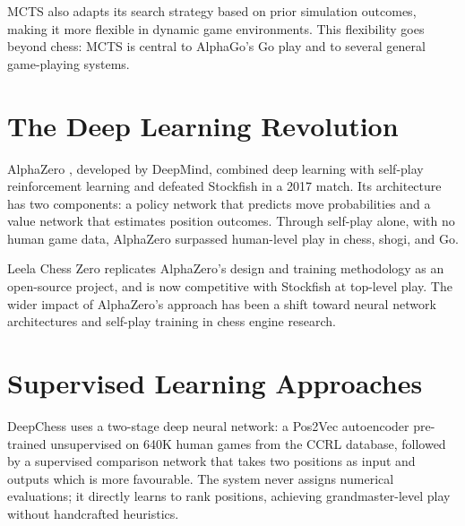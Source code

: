 MCTS also adapts its search strategy based on prior simulation outcomes, making it more flexible in dynamic game environments. This flexibility goes beyond chess: MCTS is central to AlphaGo's \cite{alphago_paper} Go play and to several general game-playing systems.


\section{The Deep Learning Revolution}

AlphaZero \cite{alphago_paper}, developed by DeepMind, combined deep learning with self-play reinforcement learning and defeated Stockfish in a 2017 match. Its architecture has two components: a policy network that predicts move probabilities and a value network that estimates position outcomes. Through self-play alone, with no human game data, AlphaZero surpassed human-level play in chess, shogi, and Go.

Leela Chess Zero replicates AlphaZero's design and training methodology as an open-source project, and is now competitive with Stockfish at top-level play. The wider impact of AlphaZero's approach has been a shift toward neural network architectures \cite{look_ahead_chess_nn} and self-play training in chess engine research.


\section{Supervised Learning Approaches}

DeepChess \cite{deep_chess_paper} uses a two-stage deep neural network: a Pos2Vec autoencoder pre-trained unsupervised on 640K human games from the CCRL database, followed by a supervised comparison network that takes two positions as input and outputs which is more favourable. The system never assigns numerical evaluations; it directly learns to rank positions, achieving grandmaster-level play without handcrafted heuristics.

